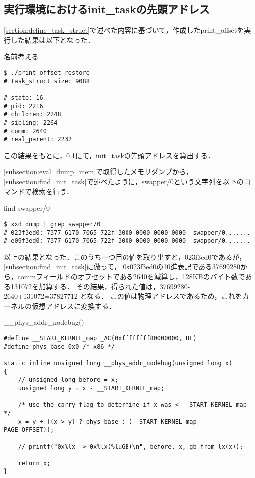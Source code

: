 \subsection{実行環境におけるinit_taskの先頭アドレス}
\label{subsection:eval_init_task_head}

\ref{section:define_task_struct}で述べた内容に基づいて，作成したprint_offsetを実行した結果は以下となった．

\begin{itembox}[l]{名前考える}
    \begin{verbatim}
$ ./print_offset_restore
# task_struct size: 9088

# state: 16
# pid: 2216
# children: 2248
# sibling: 2264
# comm: 2640
# real_parent: 2232
    \end{verbatim}
\end{itembox}

この結果をもとに，\ref{subsection:eval_init_task_head}にて，init_taskの先頭アドレスを算出する．

\ref{subsection:eval_dump_mem}で取得したメモリダンプから，\ref{subsection:find_init_task}で述べたように，swapper/0という文字列を以下のコマンドで検索を行う．

\begin{itembox}[l]{find swapper/0}
    \begin{verbatim}
$ xxd dump | grep swapper/0
# 023f3ed0: 7377 6170 7065 722f 3000 0000 0000 0000  swapper/0.......
# e09f3ed0: 7377 6170 7065 722f 3000 0000 0000 0000  swapper/0.......
    \end{verbatim}
\end{itembox}

以上の結果となった．このうち一つ目の値を取り出すと，023f3ed0であるが，\ref{subsection:find_init_task}に倣って，
0x023f3ed0の10進表記である37699280から，commフィールドのオフセットである2640を減算し，128KBのバイト数である131072を加算する．
その結果，得られた値は，37699280-2640+131072=37827712 となる．
この値は物理アドレスであるため，これをカーネルの仮想アドレスに変換する．

\begin{itembox}[l]{__phys_addr_nodebug()}
    \begin{verbatim}
#define __START_KERNEL_map _AC(0xffffffff80000000, UL)
#define phys_base 0x0 /* x86 */

static inline unsigned long __phys_addr_nodebug(unsigned long x)
{
    // unsigned long before = x;
    unsigned long y = x - __START_KERNEL_map;

    /* use the carry flag to determine if x was < __START_KERNEL_map */
    x = y + ((x > y) ? phys_base : (__START_KERNEL_map - PAGE_OFFSET));

    // printf("0x%lx -> 0x%lx(%luGB)\n", before, x, gb_from_lx(x));

    return x;
}
    \end{verbatim}
\end{itembox}

